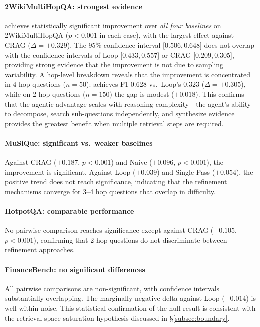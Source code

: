 \paragraph{2WikiMultiHopQA: strongest evidence}
\ours{} achieves statistically significant improvement over \emph{all four baselines} on 2WikiMultiHopQA ($p < 0.001$ in each case), with the largest effect against CRAG ($\Delta = +0.329$).
The 95\% confidence interval [$0.506, 0.648$] does not overlap with the confidence intervals of Loop [$0.433, 0.557$] or CRAG [$0.209, 0.305$], providing strong evidence that the improvement is not due to sampling variability.
A hop-level breakdown reveals that the improvement is concentrated in 4-hop questions ($n = 50$): \ours{} achieves F1 0.628 vs.\ Loop's 0.323 ($\Delta = +0.305$), while on 2-hop questions ($n = 150$) the gap is modest ($+0.018$).
This confirms that the agentic advantage scales with reasoning complexity---the agent's ability to decompose, search sub-questions independently, and synthesize evidence provides the greatest benefit when multiple retrieval steps are required.

\paragraph{MuSiQue: significant vs.\ weaker baselines}
Against CRAG ($+0.187$, $p < 0.001$) and Naive ($+0.096$, $p < 0.001$), the improvement is significant.
Against Loop ($+0.039$) and Single-Pass ($+0.054$), the positive trend does not reach significance, indicating that the refinement mechanisms converge for 3--4 hop questions that overlap in difficulty.

\paragraph{HotpotQA: comparable performance}
No pairwise comparison reaches significance except against CRAG ($+0.105$, $p < 0.001$), confirming that 2-hop questions do not discriminate between refinement approaches.

\paragraph{FinanceBench: no significant differences}
All pairwise comparisons are non-significant, with confidence intervals substantially overlapping.
The marginally negative delta against Loop ($-0.014$) is well within noise.
This statistical confirmation of the null result is consistent with the retrieval space saturation hypothesis discussed in \S\ref{subsec:boundary}.

